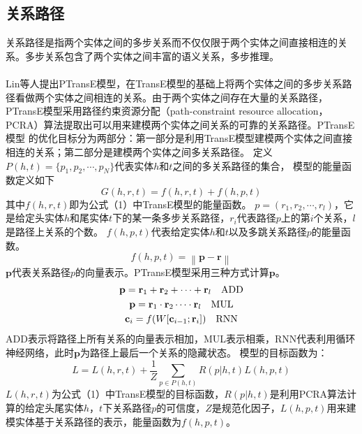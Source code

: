 \documentclass[twocolumn]{article}
\newcommand{\upcite}[1]{\textsuperscript{\textsuperscript{\cite{#1}}}}
\begin{document}
\subsection{关系路径}
关系路径是指两个实体之间的多步关系而不仅仅限于两个实体之间直接相连的关系。多步关系包含了两个实体之间丰富的语义关系，多步推理。

Lin等人\upcite{PTransE}提出PTransE模型，在TransE模型的基础上将两个实体之间的多步关系路径看做两个实体之间相连的关系。由于两个实体之间存在大量的关系路径，PTransE模型采用路径约束资源分配（path-constraint resource allocation，PCRA）算法提取出可以用来建模两个实体之间关系的可靠的关系路径。PTransE模型
的优化目标分为两部分：第一部分是利用TransE模型建模两个实体之间直接相连的关系；第二部分是建模两个实体之间多关系路径。
定义$P(h,t)=\{p_1,p_2,\cdots,p_N\}$代表实体$h$和$t$之间的多关系路径的集合，
模型的能量函数定义如下
\begin{equation}
	G(h,r,t)=f(h,r,t)+f(h,p,t)
\end{equation}
其中$f(h,r,t)$即为公式（1）中TransE模型的能量函数。
$p=(r_1,r_2,\cdots,r_l)$，它是给定头实体$h$和尾实体$t$下的某一条多步关系路径，$r_i$代表路径$p$上的第$i$个关系，$l$是路径上关系的个数。
$f(h,p,t)$代表给定实体$h$和$t$以及多跳关系路径$p$的能量函数。
\begin{equation}
	f(h,p,t)=\left \| \textbf{p}-\textbf{r} \right \|
\end{equation}
$\textbf{p}$代表关系路径$p$的向量表示。PTransE模型采用三种方式计算$\textbf{p}$。
\begin{gather}
	\textbf{p}=\textbf{r}_1+\textbf{r}_2+\cdots+\textbf{r}_l \quad \text{ADD}\notag \\
	\textbf{p}=\textbf{r}_1\cdot\textbf{r}_2\cdots\cdot\textbf{r}_l \quad \text{MUL}\notag \\
	\textbf{c}_i=f(W[\textbf{c}_{i-1};\textbf{r}_i]) \quad \text{RNN} \notag
\end{gather}
ADD表示将路径上所有关系的向量表示相加，MUL表示相乘，RNN代表利用循环神经网络，此时$\textbf{p}$为路径上最后一个关系的隐藏状态。
模型的目标函数为：
\begin{equation}
	L=L(h,r,t)+\frac{1}{Z}\sum_{p\in P(h,t)}R(p|h,t)L(h,p,t)
\end{equation}
$L(h,r,t)$为公式（1）中TransE模型的目标函数，$R(p|h,t)$是利用PCRA算法计算的给定头尾实体$h$，$t$下关系路径$p$的可信度，$Z$是规范化因子，$L(h,p,t)$用来建模实体基于关系路径的表示，能量函数为$f(h,p,t)$。
\end{document}
